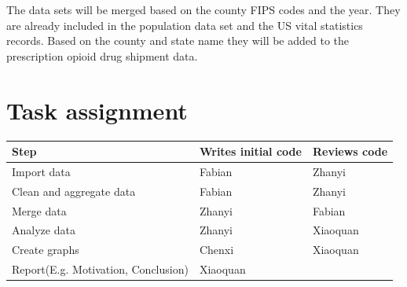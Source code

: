 \documentclass[12pt]{article}
\begin{document}
The data sets will be merged based on the county FIPS codes and the year. They are already included in the population data set and the US vital statistics records. Based on the county and state name they will be added to the prescription opioid drug shipment data.
\vspace*{1cm}


\section{Task assignment}

\begin{center}
\begin{tabular}{ l | l l}
\textbf{Step}  & \textbf{Writes initial code} & \textbf{Reviews code}\\ \hline
 Import data & Fabian & Zhanyi\\  
 Clean and aggregate data & Fabian & Zhanyi\\
 Merge data & Zhanyi & Fabian \\
 Analyze data & Zhanyi & Xiaoquan \\
 Create graphs & Chenxi & Xiaoquan\\
 Report(E.g. Motivation, Conclusion) & Xiaoquan
\end{tabular}
\end{center}
\end{document}

